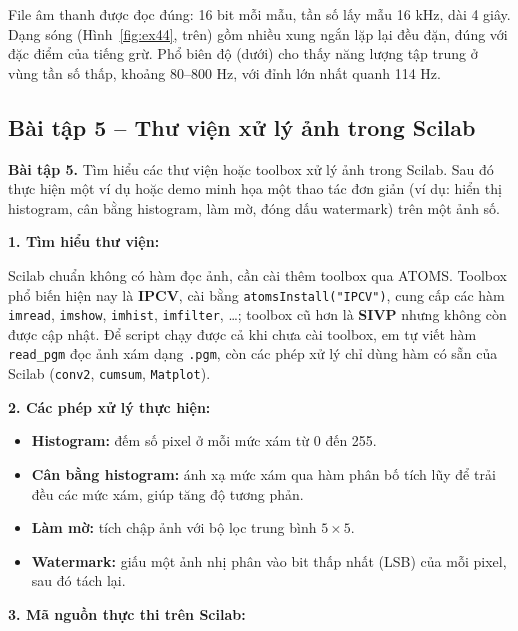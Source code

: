 \documentclass[12pt,a4paper]{article}
\begin{document}
File âm thanh được đọc đúng: 16 bit mỗi mẫu, tần số lấy mẫu 16 kHz, dài 4 giây. Dạng sóng (Hình~\ref{fig:ex44}, trên) gồm nhiều xung ngắn lặp lại đều đặn, đúng với đặc điểm của tiếng grừ. Phổ biên độ (dưới) cho thấy năng lượng tập trung ở vùng tần số thấp, khoảng 80--800 Hz, với đỉnh lớn nhất quanh 114 Hz.

\subsection{Bài tập 5 -- Thư viện xử lý ảnh trong Scilab}
\begin{mdframed}[style=exbox]
\noindent\textbf{Bài tập 5.} Tìm hiểu các thư viện hoặc toolbox xử lý ảnh trong Scilab. Sau đó thực hiện một ví dụ hoặc demo minh họa một thao tác đơn giản (ví dụ: hiển thị histogram, cân bằng histogram, làm mờ, đóng dấu watermark) trên một ảnh số.
\end{mdframed}

\noindent\textbf{1. Tìm hiểu thư viện:}

Scilab chuẩn không có hàm đọc ảnh, cần cài thêm toolbox qua ATOMS. Toolbox phổ biến hiện nay là \textbf{IPCV}, cài bằng \texttt{atomsInstall("IPCV")}, cung cấp các hàm \texttt{imread}, \texttt{imshow}, \texttt{imhist}, \texttt{imfilter}, \dots; toolbox cũ hơn là \textbf{SIVP} nhưng không còn được cập nhật. Để script chạy được cả khi chưa cài toolbox, em tự viết hàm \texttt{read\_pgm} đọc ảnh xám dạng \texttt{.pgm}, còn các phép xử lý chỉ dùng hàm có sẵn của Scilab (\texttt{conv2}, \texttt{cumsum}, \texttt{Matplot}).

\noindent\textbf{2. Các phép xử lý thực hiện:}
\begin{itemize}
    \item \textbf{Histogram:} đếm số pixel ở mỗi mức xám từ 0 đến 255.
    \item \textbf{Cân bằng histogram:} ánh xạ mức xám qua hàm phân bố tích lũy để trải đều các mức xám, giúp tăng độ tương phản.
    \item \textbf{Làm mờ:} tích chập ảnh với bộ lọc trung bình $5 \times 5$.
    \item \textbf{Watermark:} giấu một ảnh nhị phân vào bit thấp nhất (LSB) của mỗi pixel, sau đó tách lại.
\end{itemize}

\noindent\textbf{3. Mã nguồn thực thi trên Scilab:}

\end{document}
